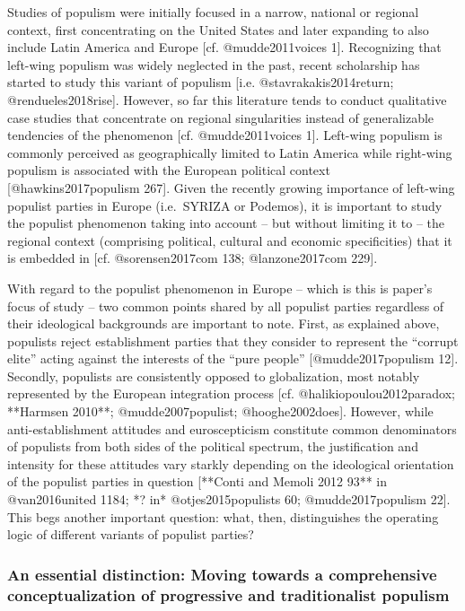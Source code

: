 \documentclass[]{article}
\begin{document}
Studies of populism were initially focused in a narrow, national or
regional context, first concentrating on the United States and later
expanding to also include Latin America and Europe {[}cf.
@mudde2011voices 1{]}. Recognizing that left-wing populism was widely
neglected in the past, recent scholarship has started to study this
variant of populism {[}i.e. @stavrakakis2014return;
@rendueles2018rise{]}. However, so far this literature tends to conduct
qualitative case studies that concentrate on regional singularities
instead of generalizable tendencies of the phenomenon {[}cf.
@mudde2011voices 1{]}. Left-wing populism is commonly perceived as
geographically limited to Latin America while right-wing populism is
associated with the European political context {[}@hawkins2017populism
267{]}. Given the recently growing importance of left-wing populist
parties in Europe (i.e.~SYRIZA or Podemos), it is important to study the
populist phenomenon taking into account -- but without limiting it to --
the regional context (comprising political, cultural and economic
specificities) that it is embedded in {[}cf. @sorensen2017com 138;
@lanzone2017com 229{]}.

With regard to the populist phenomenon in Europe -- which is this is
paper's focus of study -- two common points shared by all populist
parties regardless of their ideological backgrounds are important to
note. First, as explained above, populists reject establishment parties
that they consider to represent the ``corrupt elite'' acting against the
interests of the ``pure people'' {[}@mudde2017populism 12{]}. Secondly,
populists are consistently opposed to globalization, most notably
represented by the European integration process {[}cf.
@halikiopoulou2012paradox; **Harmsen 2010**; @mudde2007populist;
@hooghe2002does{]}. However, while anti-establishment attitudes and
euroscepticism constitute common denominators of populists from both
sides of the political spectrum, the justification and intensity for
these attitudes vary starkly depending on the ideological orientation of
the populist parties in question {[}**Conti and Memoli 2012 93** in
@van2016united 1184; *? in* @otjes2015populists 60; @mudde2017populism
22{]}. This begs another important question: what, then, distinguishes
the operating logic of different variants of populist parties?

\subsubsection{An essential distinction: Moving towards a comprehensive
conceptualization of progressive and traditionalist
populism}\label{an-essential-distinction-moving-towards-a-comprehensive-conceptualization-of-progressive-and-traditionalist-populism}
\end{document}
